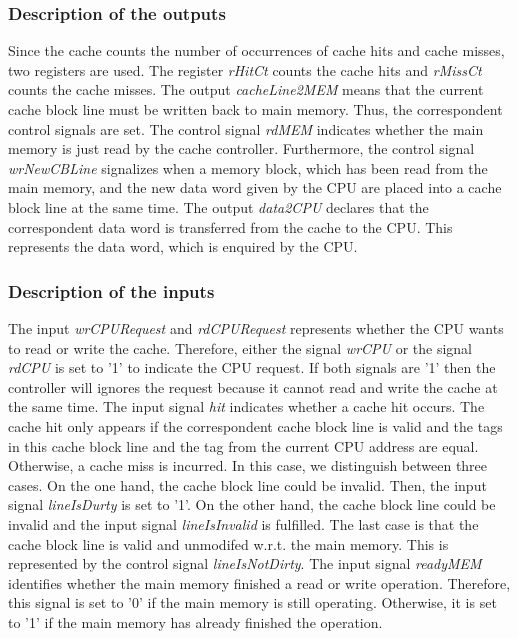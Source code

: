 \subsubsection{Description of the outputs}
Since the cache counts the number of occurrences of cache hits and cache misses, two registers are used. The register \textit{rHitCt} counts the cache hits and \textit{rMissCt} counts the cache misses.
The output \textit{cacheLine2MEM} means that the current cache block line must be written back to main memory. Thus, the correspondent control signals are set. The control signal \textit{rdMEM} indicates whether the main memory is just read by the cache controller. Furthermore, the control signal \textit{wrNewCBLine} signalizes when a memory block, which has been read from the main memory, and the new data word given by the CPU are placed into a cache block line at the same time.
The output \textit{data2CPU} declares that the correspondent data word is transferred from the cache to the CPU. This represents the data word, which is enquired by the CPU.

\subsubsection{Description of the inputs}
The input \textit{wrCPURequest} and \textit{rdCPURequest} represents whether the CPU wants to read or write the cache. Therefore, either the signal \textit{wrCPU} or the signal \textit{rdCPU} is set to '1' to indicate the CPU request. If both signals are '1' then the controller will ignores the request because it cannot read and write the cache at the same time.
The input signal \textit{hit} indicates whether a cache hit occurs. The cache hit only appears if the correspondent cache block line is valid and the tags in this cache block line and the tag from the current CPU address are equal. Otherwise, a cache miss is incurred. In this case, we distinguish between three cases. On the one hand, the cache block line could be invalid. Then, the input signal \textit{lineIsDurty} is set to '1'. On the other hand, the cache block line could be invalid and the input signal \textit{lineIsInvalid} is fulfilled. The last case is that the cache block line is valid and unmodifed w.r.t. the main memory. This is represented by the control signal \textit{lineIsNotDirty}.
The input signal \textit{readyMEM} identifies whether the main memory finished a read or write operation. Therefore, this signal is set to '0' if the main memory is still operating. Otherwise, it is set to '1' if the main memory has already finished the operation.

